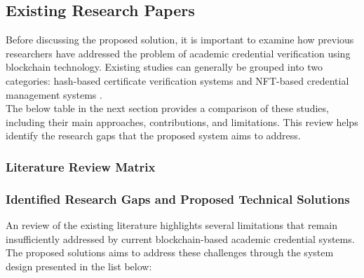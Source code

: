 \subsection{Existing Research Papers}

Before discussing the proposed solution, it is important to examine how previous researchers have addressed the problem of academic credential verification using blockchain technology. Existing studies can generally be grouped into two categories: hash-based certificate verification systems and NFT-based credential management systems \cite{kumutha2021blockchainacdaemic}.\\

The below table in the next section provides a comparison of these studies, including their main approaches, contributions, and limitations. This review helps identify the research gaps that the proposed system aims to address.
\subsubsection{Literature Review Matrix}



\subsubsection{Identified Research Gaps and Proposed Technical Solutions}

An review of the existing literature highlights several limitations that remain insufficiently addressed by current blockchain-based academic credential systems. The proposed solutions aims to address these challenges through the system design presented in the list below:

